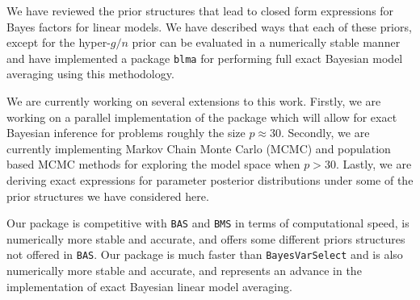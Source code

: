 We have reviewed the prior structures that lead to closed form expressions for Bayes factors for
linear models. We have described ways that each of these priors, except for the hyper-$g/n$ 
prior can be evaluated in a numerically stable manner and have implemented a package 
{\tt blma} for performing full exact Bayesian model averaging using
this methodology. 

We are currently working on several extensions to this work. Firstly, we are working on a
parallel implementation of the package which will allow for exact Bayesian inference for
problems roughly the size $p\approx 30$. Secondly, we are currently implementing  Markov
Chain Monte Carlo (MCMC) and population based MCMC methods for exploring the model space
when $p>30$. Lastly, we are deriving exact expressions for parameter posterior distributions
under some of the prior structures we have considered here.


Our package is competitive with {\tt BAS} and {\tt BMS} in terms of computational speed,
is numerically more stable and accurate, and offers some different priors structures not
offered in {\tt BAS}. Our package is much faster than {\tt BayesVarSelect} and is also
numerically more stable and accurate, and represents an advance in the implementation of
exact Bayesian linear model averaging.


